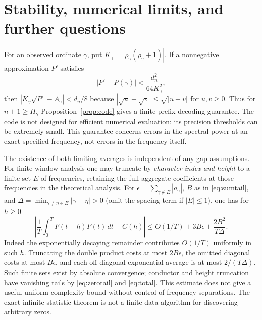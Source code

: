 \documentclass[11pt]{article}
\theoremstyle{remark}\newtheorem{remark}[theorem]{Remark}
\begin{document}
\section{Stability, numerical limits, and further questions}
For an observed ordinate $\gamma$, put $K_\gamma=|\rho_\gamma(\rho_\gamma+1)|$. If a nonnegative approximation $P'$ satisfies
\[
|P'-P(\gamma)|<\frac{d_n^2}{64K_\gamma^2},
\]
then $|K_\gamma\sqrt{P'}-A_\gamma|<d_n/8$ because $|\sqrt{u}-\sqrt{v}|\le\sqrt{|u-v|}$ for $u,v\ge0$. Thus for $n+1\ge H_\gamma$ Proposition~\ref{prop:code} gives a finite prefix decoding guarantee. The code is not designed for efficient numerical evaluation: its precision thresholds can be extremely small. This guarantee concerns errors in the spectral power at an exact specified frequency, not errors in the frequency itself.

The existence of both limiting averages is independent of any gap assumptions. For finite-window analysis one may truncate by \emph{character index and height} to a finite set $E$ of frequencies, retaining the full aggregate coefficients at those frequencies in the theoretical analysis. For $\epsilon=\sum_{\gamma\notin E}|a_\gamma|$, $B$ as in \eqref{eq:sumtail}, and $\Delta=\min_{\gamma\ne\eta\in E}|\gamma-\eta|>0$ (omit the spacing term if $|E|\le1$), one has for $h\ge0$
\[
\left|\frac1T\int_0^T F(t+h)\overline{F(t)}\,dt-C(h)\right|
\le O(1/T)+3B\epsilon+\frac{2B^2}{T\Delta}.
\]
Indeed the exponentially decaying remainder contributes $O(1/T)$ uniformly in such $h$. Truncating the double product costs at most $2B\epsilon$, the omitted diagonal costs at most $B\epsilon$, and each off-diagonal exponential average is at most $2/(T\Delta)$. Such finite sets exist by absolute convergence; conductor and height truncation have vanishing tails by \eqref{eq:zerotail} and \eqref{eq:total}. This estimate does not give a useful uniform complexity bound without control of frequency separations. The exact infinite-statistic theorem is not a finite-data algorithm for discovering arbitrary zeros.
\end{document}

